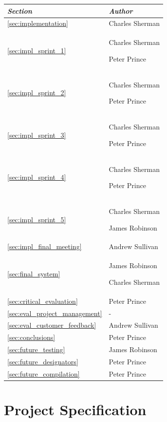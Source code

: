\documentclass[a4paper, 12pt, twoside]{article}
\newcommand*{\fullref}[1]{\ref{#1} \nameref{#1}}
\begin{document}
\begin{tabularx}{\textwidth}{|X|X|} \hline
  \emph{Section}                         & \emph{Author}                      \\ \hline
  \fullref{sec:implementation}           & Charles Sherman                    \\
  \fullref{sec:impl_sprint_1}            & Charles Sherman\par Peter Prince   \\
  \fullref{sec:impl_sprint_2}            & Charles Sherman\par Peter Prince   \\
  \fullref{sec:impl_sprint_3}            & Charles Sherman\par Peter Prince   \\
  \fullref{sec:impl_sprint_4}            & Charles Sherman\par Peter Prince   \\
  \fullref{sec:impl_sprint_5}            & Charles Sherman\par James Robinson \\
  \fullref{sec:impl_final_meeting}       & Andrew Sullivan                    \\ \hline
  \fullref{sec:final_system}             & James Robinson\par Charles Sherman \\ \hline
  \fullref{sec:critical_evaluation}      & Peter Prince                       \\
  \fullref{sec:eval_project_management}  & -                                  \\
  \fullref{sec:eval_customer_feedback}   & Andrew Sullivan                    \\ \hline
  \fullref{sec:conclusions}              & Peter Prince                       \\ \hline
  \fullref{sec:future_testing}           & James Robinson                     \\
  \fullref{sec:future_designators}       & Peter Prince                       \\
  \fullref{sec:future_compilation}       & Peter Prince                       \\ \hline
\end{tabularx}

\section{Project Specification}
\end{document}
